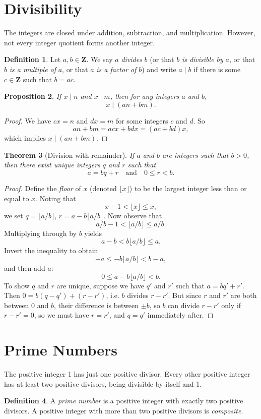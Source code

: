 \documentclass{amsbook}
\numberwithin{section}{chapter}
\theoremstyle{plain}
\newtheorem{thm}{Theorem}[section]
\newtheorem{prop}[thm]{Proposition}
\theoremstyle{definition}
\newtheorem{defn}[thm]{Definition}
\def\ZZ{\mathbf Z}
\begin{document}
\section{Divisibility}
The integers are closed under addition, subtraction,
and multiplication.
However, not every integer quotient forms another integer.
\begin{defn}
Let $a, b\in\ZZ$. We say $a$ \textit{divides} $b$
(or that $b$ \textit{is divisible by} $a$,
or that $b$ \textit{is a multiple of} $a$,
or that $a$ \textit{is a factor of} $b$) and write $a\mid b$
if there is 
some $c\in\ZZ$ such that $b = ac$.
\end{defn}
\begin{prop}
If $x\mid n$ and $x\mid m$, then for any integers $a$ and $b$,
\[x\mid (an + bm).\]
\end{prop}
\begin{proof}
We have $cx = n$ and $dx = m$ for some integers $c$ and $d$.
So
\[an + bm = acx + bdx = (ac + bd)x,\]
which implies $x\mid(an + bm)$.
\end{proof}
\begin{thm}[Division with remainder]
If $a$ and $b$ are integers such that $b > 0$, then
there exist unique integers $q$ and $r$ such that
\[a = bq + r\quad\text{and}\quad 0\le r < b.\]
\end{thm}
\begin{proof}
Define the \textit{floor} of $x$ (denoted $\lfloor x\rfloor$)
to be the largest integer
less than or equal to $x$.
Noting that
\[x - 1 < \lfloor x\rfloor\le x,\]
we set $q = \lfloor a/b\rfloor$, $r = a - b\lfloor a/b\rfloor$.
Now observe that
\[a/b - 1 < \lfloor a/b\rfloor\le a/b.\]
Multiplying through by $b$ yields
\[a - b < b\lfloor a/b\rfloor\le a.\]
Invert the inequality to obtain
\[-a\le -b\lfloor a/b\rfloor < b - a,\]
and then add $a$:
\[0\le a - b\lfloor a/b\rfloor < b.\]
To show $q$ and $r$ are unique, suppose we have $q'$ and $r'$
such that $a = bq' + r'$. Then $0 = b(q - q') + (r - r')$, i.e.
$b$ divides $r - r'$. But since $r$ and $r'$ are both between 0
and $b$, their difference is between $\pm b$, so $b$ can divide
$r - r'$ only if $r - r' = 0$, so we must have $r = r'$,
and $q = q'$ immediately after.
\end{proof}
\section{Prime Numbers}
The positive integer 1 has just one positive divisor. Every
other positive integer has at least two positive divisors,
being divisible by itself and 1.
\begin{defn}
A \textit{prime number} is a positive integer with exactly two
positive divisors. A positive integer with
more than two positive divisors is \textit{composite}.
\end{defn}
\end{document}

